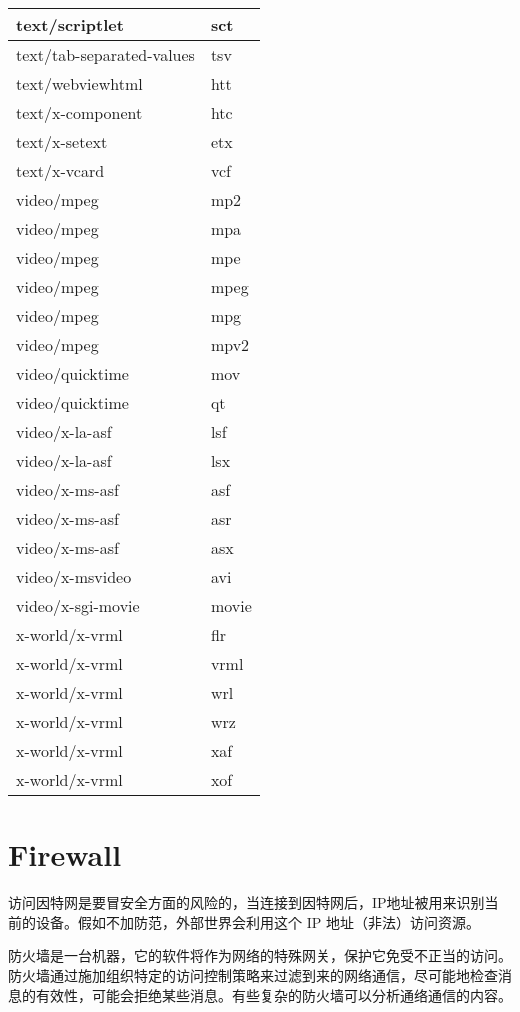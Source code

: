 \begin{longtable}{|p{200pt}|p{40pt}|}
\hline
text/scriptlet	&sct\\
\hline
text/tab-separated-values	&tsv\\
\hline
text/webviewhtml	&htt\\
\hline
text/x-component	&htc\\
\hline
text/x-setext	&etx\\
\hline
text/x-vcard	&vcf\\
\hline
video/mpeg	&mp2\\
\hline
video/mpeg	&mpa\\
\hline
video/mpeg	&mpe\\
\hline
video/mpeg	&mpeg\\
\hline
video/mpeg	&mpg\\
\hline
video/mpeg	&mpv2\\
\hline
video/quicktime	&mov\\
\hline
video/quicktime	&qt\\
\hline
video/x-la-asf	&lsf\\
\hline
video/x-la-asf	&lsx\\
\hline
video/x-ms-asf	&asf\\
\hline
video/x-ms-asf	&asr\\
\hline
video/x-ms-asf	&asx\\
\hline
video/x-msvideo&	avi\\
\hline
video/x-sgi-movie	&movie\\
\hline
x-world/x-vrml	&flr\\
\hline
x-world/x-vrml	&vrml\\
\hline
x-world/x-vrml	&wrl\\
\hline
x-world/x-vrml	&wrz\\
\hline
x-world/x-vrml	&xaf\\
\hline
x-world/x-vrml	&xof\\
\hline
\end{longtable}

\section{Firewall}

访问因特网是要冒安全方面的风险的，当连接到因特网后，IP地址被用来识别当前的设备。假如不加防范，外部世界会利用这个 IP 地址（非法）访问资源。




防火墙是一台机器，它的软件将作为网络的特殊网关，保护它免受不正当的访问。防火墙通过施加组织特定的访问控制策略来过滤到来的网络通信，尽可能地检查消息的有效性，可能会拒绝某些消息。有些复杂的防火墙可以分析通络通信的内容。

